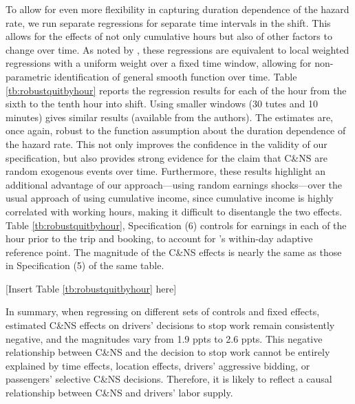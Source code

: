 \documentclass[reviewmode]{restat}
\begin{document}
To allow for even more flexibility in capturing duration dependence of the hazard rate, we run separate 
regressions for separate time intervals in the shift. This allows for the effects of not only cumulative 
hours but also of other factors to change over time. As noted by \cite{thakral2018daily}, these regressions 
are equivalent to local weighted regressions \citep{cleveland1988locally} with a uniform weight over a fixed
time window, allowing for non-parametric identification of general smooth function over time.  
Table \ref{tb:robustquitbyhour} reports the regression results for each of the hour from the sixth to the
tenth hour into shift. Using smaller windows (30 tutes and 10 minutes) gives similar results (available 
from the authors). The estimates are, once again, robust to the function assumption about the duration
dependence of the hazard rate. This not only improves the confidence in the validity of our specification,
but also provides strong evidence for the claim that C\&NS are random exogenous events over time. 
Furthermore, these results highlight an additional advantage of our approach---using random earnings 
shocks---over the usual approach of using cumulative income, since cumulative income is highly correlated
with working hours, making it difficult to disentangle the two effects.  Table \ref{tb:robustquitbyhour}, 
Specification (6) controls for earnings in each of the hour prior to the trip and booking, to account for \cite{thakral2018daily}'s within-day adaptive reference point. The magnitude of the C\&NS effects is nearly 
the same as those in Specification (5) of the same table.


\begin{center}
	[Insert Table \ref{tb:robustquitbyhour} here]
\end{center}


In summary, when regressing on different sets of controls and fixed effects, estimated C\&NS effects on
drivers' decisions to stop work remain consistently negative, and the magnitudes vary
from 1.9 ppts to 2.6 ppts. This negative relationship between C\&NS and the decision to stop work cannot
be entirely explained by time effects, location effects, drivers' aggressive bidding, or passengers' 
selective C\&NS decisions. Therefore, it is likely to reflect a causal relationship between C\&NS and 
drivers' labor supply.
\end{document}

